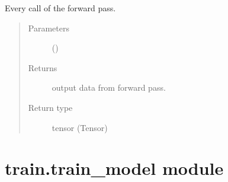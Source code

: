 \documentclass[letterpaper,10pt,english]{sphinxmanual}
\begin{document}
\begin{fulllineitems}
\begin{fulllineitems}
\label{\detokenize{docs/source/train:train.model.Generalised_Recurrent_Model.forward}}
Every call of the forward pass.
\begin{quote}\begin{description}
\item[{Parameters}] \leavevmode
{} () \textendash{} 

\item[{Returns}] \leavevmode
output data from forward pass.

\item[{Return type}] \leavevmode
tensor (Tensor)

\end{description}\end{quote}

\end{fulllineitems}


\end{fulllineitems}



\section{train.train\_model module}
\label{\detokenize{docs/source/train:module-train.train_model}}\label{\detokenize{docs/source/train:train-train-model-module}}
\end{document}
